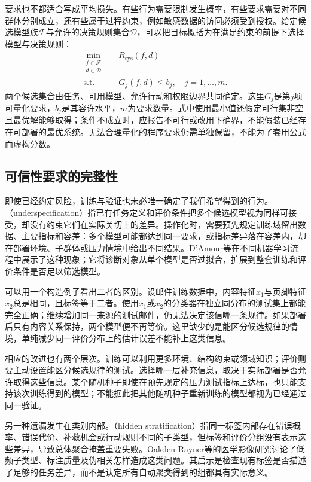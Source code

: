 要求也不都适合写成平均损失。有些行为需要限制发生概率，有些要求需要对不同群体分别成立，还有些属于过程约束，例如敏感数据的访问必须受到授权。给定候选模型族$\mathcal F$与允许的决策规则集合$\mathcal D$，可以把目标概括为在满足约束的前提下选择模型与决策规则：
\begin{equation}
 \begin{aligned}
  \min_{\substack{f\in\mathcal F\\d\in\mathcal D}}\quad
  &R_{\mathrm{sys}}(f,d)\\
  \text{s.t.}\quad
  &G_j(f,d)\leq b_j,\quad j=1,\ldots,m.
 \end{aligned}
 \label{eq:trust-constrained-objective}
\end{equation}
两个候选集合由任务、可用模型、允许行动和权限边界共同确定。这里$G_j$是第$j$项可量化要求，$b_j$是其容许水平，$m$为要求数量。式中使用最小值还假定可行集非空且最优解能够取得；条件不成立时，应报告不可行或改用下确界，不能假装已经存在可部署的最优系统。无法合理量化的程序要求仍需单独保留，不能为了套用公式而虚构分数。

\subsection{可信性要求的完整性}

即使已经约定风险，训练与验证也未必唯一确定了我们希望得到的行为。（underspecification）指已有任务定义和评价条件把多个候选模型视为同样可接受，却没有约束它们在实际关切上的差异。操作化时，需要预先规定训练域留出数据、主要指标和容差：多个模型可能都达到同一要求，或指标差异落在容差内，却在部署环境、子群体或压力情境中给出不同结果。D'Amour等在不同机器学习流程中展示了这种现象；它将诊断对象从单个模型是否过拟合，扩展到整套训练和评价条件是否足以筛选模型。

可以用一个构造例子看出二者的区别。设邮件训练数据中，内容特征$x_1$与页脚特征$x_2$总是相同，且标签等于二者。使用$x_1$或$x_2$的分类器在独立同分布的测试集上都能完全正确；继续增加同一来源的测试邮件，仍无法决定该信哪一条规律。如果部署后只有内容关系保持，两个模型便不再等价。这里缺少的是能区分候选规律的情境，单纯减少同一评价分布上的估计误差不能补上这类信息。

相应的改进也有两个层次。训练可以利用更多环境、结构约束或领域知识；评价则要主动设置能区分候选规律的测试。选择哪一层补充信息，取决于实际部署是否允许取得这些信息。某个随机种子即使在预先规定的压力测试指标上达标，也只能支持该次训练得到的模型；不能据此把其他随机种子重新训练的模型都视为已经通过同一验证。

另一种遗漏发生在类别内部。（hidden stratification）指同一标签内部存在错误概率、错误代价、补救机会或行动规则不同的子类型，但标签和评价分组没有表示这些差异，导致总体聚合掩盖重要失败。Oakden-Rayner等的医学影像研究讨论了低频子类型、标注质量及伪相关怎样造成这类问题。其启示是检查现有标签是否描述了足够的任务差异，而不是认定所有自动聚类得到的组都具有实际意义。

